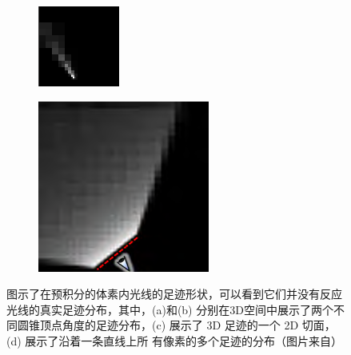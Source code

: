 \begin{figure}
\begin{subfigure}[b]{0.243\textwidth}
		\caption{}
	\end{subfigure}
	\begin{subfigure}[b]{0.243\textwidth}
		\includegraphics[width=\textwidth]{figures/vct/vct-8-3}
		\caption{}
	\end{subfigure}
	\begin{subfigure}[b]{0.243\textwidth}
		\includegraphics[width=\textwidth]{figures/vct/vct-8-4}
		\caption{}
	\end{subfigure}
	\caption{图示了在预积分的体素内光线的足迹形状，可以看到它们并没有反应光线的真实足迹分布，其中，(a)和(b) 分别在3D空间中展示了两个不同圆锥顶点角度的足迹分布，(c) 展示了 3D 足迹的一个 2D 切面，(d) 展示了沿着一条直线上所 有像素的多个足迹的分布（图片来自\cite{a:InteractiveIndirectIlluminationUsingVoxelConeTracing}）}
	\label{f:vct-8}
\end{figure}
